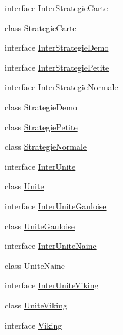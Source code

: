 \begin{DoxyCompactItemize}
interface \hyperlink{interface_small_world_1_1_inter_strategie_carte}{Inter\-Strategie\-Carte}
\item 
class \hyperlink{class_small_world_1_1_strategie_carte}{Strategie\-Carte}
\item 
interface \hyperlink{interface_small_world_1_1_inter_strategie_demo}{Inter\-Strategie\-Demo}
\item 
interface \hyperlink{interface_small_world_1_1_inter_strategie_petite}{Inter\-Strategie\-Petite}
\item 
interface \hyperlink{interface_small_world_1_1_inter_strategie_normale}{Inter\-Strategie\-Normale}
\item 
class \hyperlink{class_small_world_1_1_strategie_demo}{Strategie\-Demo}
\item 
class \hyperlink{class_small_world_1_1_strategie_petite}{Strategie\-Petite}
\item 
class \hyperlink{class_small_world_1_1_strategie_normale}{Strategie\-Normale}
\item 
interface \hyperlink{interface_small_world_1_1_inter_unite}{Inter\-Unite}
\item 
class \hyperlink{class_small_world_1_1_unite}{Unite}
\item 
interface \hyperlink{interface_small_world_1_1_inter_unite_gauloise}{Inter\-Unite\-Gauloise}
\item 
class \hyperlink{class_small_world_1_1_unite_gauloise}{Unite\-Gauloise}
\item 
interface \hyperlink{interface_small_world_1_1_inter_unite_naine}{Inter\-Unite\-Naine}
\item 
class \hyperlink{class_small_world_1_1_unite_naine}{Unite\-Naine}
\item 
interface \hyperlink{interface_small_world_1_1_inter_unite_viking}{Inter\-Unite\-Viking}
\item 
class \hyperlink{class_small_world_1_1_unite_viking}{Unite\-Viking}
\item 
interface \hyperlink{interface_small_world_1_1_viking}{Viking}
\end{DoxyCompactItemize}
